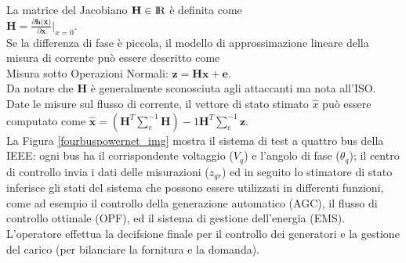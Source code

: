 La matrice del Jacobiano $\textbf{H} \in {\rm I\!R}$ è definita come\\
\indent$\textbf{H}=\frac{\partial\textbf{h(x)}}{\partial\textbf{x}}|_{x=0}$.\\
Se la differenza di fase è piccola, il modello di approssimazione lineare della misura di corrente può essere descritto come\\
\indent Misura sotto Operazioni Normali: $\textbf{z} =  \textbf{Hx} + \textbf{e}$.\\
Da notare che $\textbf{H}$ è generalmente sconosciuta agli attaccanti ma nota all'ISO. Date le misure sul flusso di corrente, il vettore di stato stimato $\widehat{x}$ può essere computato come $\widehat{\textbf{x}} = (\textbf{H}^T\sum_e^{-1}\textbf{H})-1\textbf{H}^T\sum_e^{-1}\textbf{z}$.\\
La Figura \ref{fourbuspowernet_img} mostra il sistema di test a quattro bus della IEEE: ogni bus ha il corrispondente voltaggio ($V_q$) e l'angolo di fase ($\theta_q$); il centro di controllo invia i dati delle misurazioni ($z_{qr}$) ed in seguito lo stimatore di stato inferisce gli stati del sistema che possono essere utilizzati in differenti funzioni, come ad esempio il controllo della generazione automatico (AGC), il flusso di controllo ottimale (OPF), ed il sistema di gestione dell'energia (EMS). L'operatore effettua la decifsione finale per il controllo dei generatori e la gestione del carico (per bilanciare la fornitura e la domanda).
